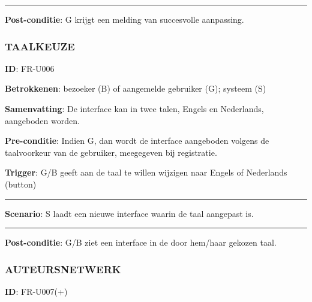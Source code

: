 \vspace{2 mm}
\hrule
\vspace{4 mm}

\noindent \textbf{Post-conditie}: G krijgt een melding van succesvolle aanpassing. \\




\subsubsection{TAALKEUZE}
\vspace{2 mm}

\textbf{ID}: FR-U006
\vspace{2 mm}

\noindent \textbf{Betrokkenen}: bezoeker (B) of aangemelde gebruiker (G); systeem (S) 
\vspace{2 mm}

\noindent \textbf{Samenvatting}: De interface kan in twee talen, Engels en Nederlands, aangeboden worden. 
\vspace{2 mm}

\noindent \textbf{Pre-conditie}: Indien G, dan wordt de interface aangeboden volgens de taalvoorkeur van de gebruiker, meegegeven bij registratie.
\vspace{2 mm}

\noindent \textbf{Trigger}: G/B geeft aan de taal te willen wijzigen naar Engels of Nederlands (button)

\vspace{4 mm}
\hrule
\vspace{2 mm}
\noindent \textbf{Scenario}:
\noindent S laadt een nieuwe interface waarin de taal aangepast is.
\vspace{2 mm}
\hrule
\vspace{4 mm}

\noindent \textbf{Post-conditie}: G/B ziet een interface in de door hem/haar gekozen taal. \\





\subsubsection{AUTEURSNETWERK}
\vspace{2 mm}

\textbf{ID}: FR-U007(+)
\vspace{2 mm}

